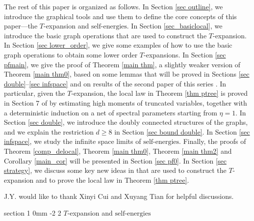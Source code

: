 \documentclass{article}
\makeatletter
\newcommand{\1}{\mathds{1}}
\numberwithin{equation}{section}
\renewcommand{\geq}{\geqslant}
\renewcommand{\ge}{\geq}
\newcommand{\selfs}{\text{self-energies}}
\theoremstyle{plain} %
\theoremstyle{remark}
\renewcommand{\section}{\@startsection
{section}%
{1}%
{0mm}%
{-2\baselineskip}%
{2\baselineskip}%
{\normalfont\large\scshape\centering}} %
\renewcommand{\subsection}{\@startsection
{subsection}%
{2}%
{0mm}%
{-\baselineskip}%
{0.5\baselineskip}%
{\normalfont\bf\itshape}} %
\makeatother
\begin{document}
 
The rest of this paper is organized as follows. %
In Section \ref{sec outline}, we introduce the graphical tools and use them to define the core concepts of this paper---the $T$-expansion and $\selfs$. In Section \ref{sec_basiclocal}, we introduce the basic graph operations that are used to construct the $T$-expansion. In Section \ref{sec lower_order}, we give some examples of how to use the basic graph operations to obtain some lower order $T$-expansions. In Section \ref{sec pfmain}, we give the proof of Theorem \ref{main thm}, a slightly weaker version of Theorem \ref{main thm0},  based on some lemmas that will be proved in Sections \ref{sec double}--\ref{sec infspace} and on results of the second paper of this series \cite{PartII_high}. In particular, given the $T$-expansion, the local law in Theorem \ref{thm ptree} is proved in Section 7 of \cite{PartII_high} by estimating high moments of truncated variables, together with a deterministic induction on a net of spectral parameters starting from $\eta=1$.
In Section \ref{sec double}, we introduce the doubly connected structures of the graphs, and we explain the restriction $d \ge 8$ in Section \ref{sec bound double}. In Section \ref{sec infspace}, we study the infinite space limits of $\selfs$. Finally, the proofs of Theorem \ref{comp_delocal}, Theorem \ref{main thm0}, Theorem \ref{main thm2} and Corollary \ref{main_cor} will be presented in Section \ref{sec pf0}. In Section \ref{sec strategy}, we discuss some key new ideas in \cite{PartII_high} that are used to construct the $T$-expansion and to prove the local law in Theorem \ref{thm ptree}.

\medskip
{} J.Y. would like to thank Xinyi Cui and Xuyang Tian for helpful discussions.


\section{$T$-expansion and $\selfs$}\label{sec outline}

\end{document}
